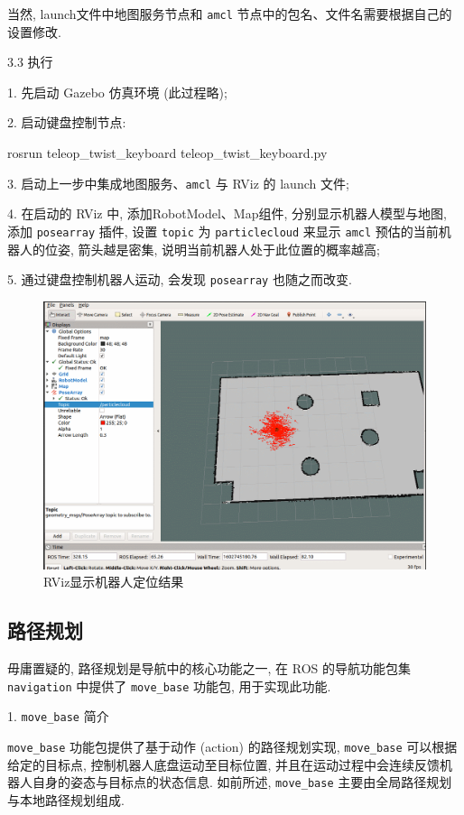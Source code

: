 \documentclass[openany, fontset=windowsold]{ctexbook}
\theoremstyle{kaiti}
\theoremstyle{normal}
\begin{document}
当然, launch文件中地图服务节点和 \verb|amcl| 节点中的包名、文件名需要根据自己的设置修改.

3.3 执行

1. 先启动 Gazebo 仿真环境 (此过程略);

2. 启动键盘控制节点: 

\begin{bash}
  rosrun teleop_twist_keyboard teleop_twist_keyboard.py
\end{bash}

3. 启动上一步中集成地图服务、\verb|amcl| 与 RViz 的 launch 文件; 

4. 在启动的 RViz 中, 添加RobotModel、Map组件, 分别显示机器人模型与地图, 添加 \verb|posearray| 插件, 设置 \verb|topic| 为 \verb|particlecloud| 来显示 \verb|amcl| 预估的当前机器人的位姿, 箭头越是密集, 说明当前机器人处于此位置的概率越高; 

5. 通过键盘控制机器人运动, 会发现 \verb|posearray| 也随之而改变.

\begin{figure}[!ht]
  \centering
  \includegraphics[width=.9\textwidth]{ros_demo_nav_localization_rviz.png}
  \caption{RViz显示机器人定位结果}
  \label{fig:ros_demo_nav_localization_rviz}
\end{figure}

\subsection{路径规划}

毋庸置疑的, 路径规划是导航中的核心功能之一, 在 ROS 的导航功能包集 \verb|navigation| 中提供了 \verb|move_base| 功能包, 用于实现此功能.

1. \verb|move_base| 简介

\verb|move_base| 功能包提供了基于动作 (action) 的路径规划实现, \verb|move_base| 可以根据给定的目标点, 控制机器人底盘运动至目标位置, 并且在运动过程中会连续反馈机器人自身的姿态与目标点的状态信息. 如前所述, \verb|move_base| 主要由全局路径规划与本地路径规划组成.
\end{document}
